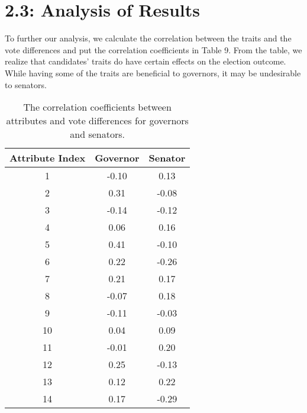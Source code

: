 \documentclass[10pt]{article}
\begin{document}
\section*{\small{2.3: Analysis of Results}}
	To further our analysis, we calculate the correlation between the traits and the vote differences and put the correlation coefficients in Table 9. From the table, we realize that candidates' traits do have certain effects on the election outcome. While having some of the traits are beneficial to governors, it may be undesirable to senators.\\
	\begin{table}[ht]
 		\centering
 		\begin{tabular}{|c|c|c|}
		\hline
		\textbf{Attribute Index} & \textbf{Governor} & \textbf{Senator} \\ \hline
		1 & -0.10 & 0.13 \\ \hline
		2 & 0.31 & -0.08 \\ \hline
		3 & -0.14 & -0.12 \\ \hline
		4 & 0.06 & 0.16 \\ \hline
		5 & 0.41 & -0.10 \\ \hline
		6 & 0.22 & -0.26 \\ \hline
		7 & 0.21 & 0.17 \\ \hline
		8 & -0.07 & 0.18 \\ \hline
		9 & -0.11 & -0.03 \\ \hline
		10 & 0.04 & 0.09 \\ \hline
		11 & -0.01 & 0.20 \\ \hline
		12 & 0.25 & -0.13 \\ \hline
		13 & 0.12 & 0.22 \\ \hline
		14 & 0.17 & -0.29 \\ \hline
 		\end{tabular}
		\caption{The correlation coefficients between attributes and vote differences for governors and senators.}\label{tab6}
	\end{table}\\
\end{document}
